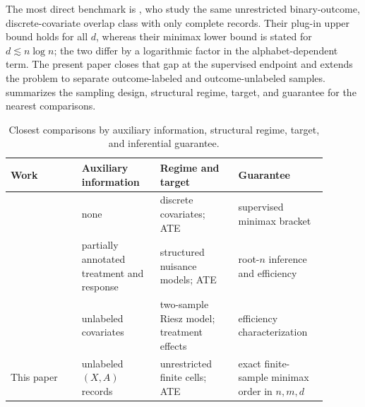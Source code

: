 The most direct benchmark is \citet[Theorems 1--2 and the discussion following Theorem 2]{ZengBalakrishnanHanKennedy2024}, who study the same unrestricted binary-outcome, discrete-covariate overlap class with only complete records. Their plug-in upper bound holds for all \(d\), whereas their minimax lower bound is stated for \(d\lesssim n\log n\); the two differ by a logarithmic factor in the alphabet-dependent term. The present paper closes that gap at the supervised endpoint and extends the problem to separate outcome-labeled and outcome-unlabeled samples.  summarizes the sampling design, structural regime, target, and guarantee for the nearest comparisons.

\begin{table}[t]
\centering
\small
\begin{tabular}{p{0.20\linewidth}p{0.22\linewidth}p{0.22\linewidth}p{0.25\linewidth}}
\hline
Work & Auxiliary information & Regime and target & Guarantee \\
\hline
\citet{ZengBalakrishnanHanKennedy2024} & none & discrete covariates; ATE & supervised minimax bracket \\
\citet{HouMukherjeeCai2025} & partially annotated treatment and response & structured nuisance models; ATE & root-\(n\) inference and efficiency \\
\citet{Kato2025} & unlabeled covariates & two-sample Riesz model; treatment effects & efficiency characterization \\
This paper & unlabeled \((X,A)\) records & unrestricted finite cells; ATE & exact finite-sample minimax order in \(n,m,d\) \\
\hline
\end{tabular}
\caption{Closest comparisons by auxiliary information, structural regime, target, and inferential guarantee.}
\label{tab:closest-comparisons}
\end{table}
